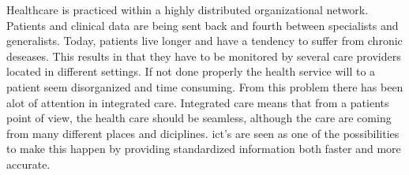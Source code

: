 Healthcare is practiced within a highly distributed organizational network.
Patients and clinical data are being sent back and fourth between specialists and generalists.
Today, patients live longer and have a tendency to suffer from chronic deseases. 
This results in that they have to be monitored by several care providers located in different settings.
If not done properly the health service will to a patient seem disorganized and time consuming.
From this problem there has been alot of attention in integrated care. 
Integrated care means that from a patients point of view, the health care should be seamless, although the care are coming from many different places and diciplines. 
\gls{ict}'s are seen as one of the possibilities to make this happen by providing standardized information both faster and more accurate.
\cite{ictcare:winther}
\cite{ehealth:blaya}

